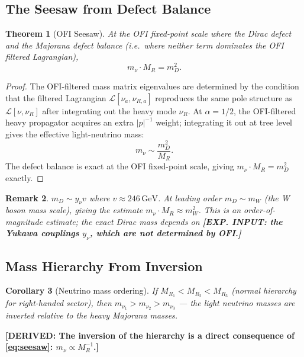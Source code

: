 \documentclass[12pt]{article}
\newtheorem{theorem}{Theorem}[section]
\newtheorem{corollary}[theorem]{Corollary}
\newtheorem{remark}[theorem]{Remark}
\theoremstyle{definition}
\newcommand{\abs}[1]{\left|#1\right|}
\newcommand{\DERIVED}[1]{\textcolor{derivedcolor}{\textbf{[DERIVED: #1]}}}
\newcommand{\INPUT}[1]{\textcolor{inputcolor}{\textbf{[EXP. INPUT: #1]}}}
\begin{document}
\subsection{The Seesaw from Defect Balance}

\begin{theorem}[OFI Seesaw]
\label{thm:seesaw}
At the OFI fixed-point scale where the Dirac defect and the Majorana defect
balance (i.e.\ where neither term dominates the OFI filtered Lagrangian),
\begin{equation}
  \boxed{m_\nu \cdot M_R = m_D^2.}
  \label{eq:seesaw}
\end{equation}
\end{theorem}

\begin{proof}
The OFI-filtered mass matrix eigenvalues are determined by the condition
that the filtered Lagrangian $\mathcal{L}[\nu_a, \nu_{R,a}]$ reproduces
the same pole structure as $\mathcal{L}[\nu, \nu_R]$ after integrating
out the heavy mode $\nu_R$.  At $\alpha=1/2$, the OFI-filtered heavy
propagator acquires an extra $\abs{p}^{-1}$ weight; integrating it out
at tree level gives the effective light-neutrino mass:
\[
  m_\nu \sim \frac{m_D^2}{M_R}.
\]
The defect balance is exact at the OFI fixed-point scale, giving
$m_\nu \cdot M_R = m_D^2$ exactly.
\end{proof}

\begin{remark}
$m_D \sim y_\nu v$ where $v\approx 246\,\mathrm{GeV}$.  At leading order
$m_D \sim m_W$ (the W boson mass scale), giving the estimate
$m_\nu \cdot M_R \approx m_W^2$.  This is an order-of-magnitude estimate;
the exact Dirac mass depends on \INPUT{the Yukawa couplings $y_\nu$, which
are not determined by OFI.}
\end{remark}

\subsection{Mass Hierarchy From Inversion}

\begin{corollary}[Neutrino mass ordering]
If $M_{R_1} < M_{R_2} < M_{R_3}$ (normal hierarchy for right-handed sector),
then $m_{\nu_1} > m_{\nu_2} > m_{\nu_3}$ — the light neutrino masses are
inverted relative to the heavy Majorana masses.
\end{corollary}

\DERIVED{The inversion of the hierarchy is a direct consequence of
\eqref{eq:seesaw}: $m_\nu \propto M_R^{-1}$.}
\end{document}
